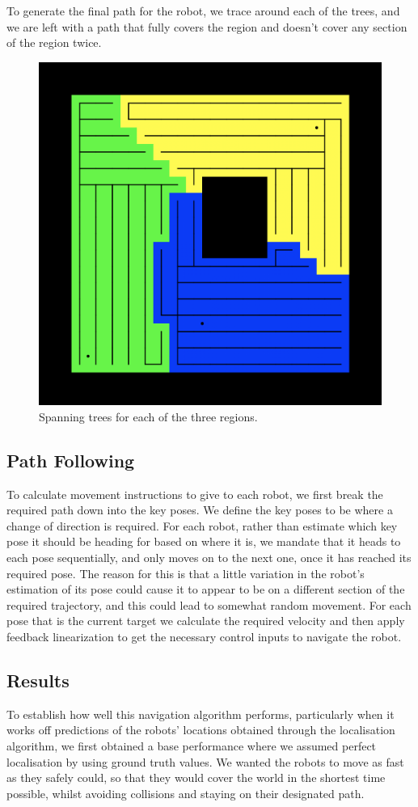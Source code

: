 \documentclass[a4paper, 10pt, conference]{ieeeconf}      %
\begin{document}
To generate the final path for the robot, we trace around each of the trees, and we are left with a path that fully covers the region and doesn't cover any section of the region twice.

\begin{figure}
	\centering
	\includegraphics[width=0.6\columnwidth]{figure_mst.png}
	\caption{Spanning trees for each of the three regions.}
	\label{fig:mst}
\end{figure}

\subsection{Path Following}
To calculate movement instructions to give to each robot, we first break the required path down into the key poses. We define the key poses to be where a change of direction is required. For each robot, rather than estimate which key pose it should be heading for based on where it is, we mandate that it heads to each pose sequentially, and only moves on to the next one, once it has reached its required pose. The reason for this is that a little variation in the robot's estimation of its pose could cause it to appear to be on a different section of the required trajectory, and this could lead to somewhat random movement. For each pose that is the current target we calculate the required velocity and then apply feedback linearization to get the necessary control inputs to navigate the robot.



\subsection{Results}
To establish how well this navigation algorithm performs, particularly when it works off predictions of the robots' locations obtained through the localisation algorithm, we first obtained a base performance where we assumed perfect localisation by using ground truth values. We wanted the robots to move as fast as they safely could, so that they would cover the world in the shortest time possible, whilst avoiding collisions and staying on their designated path.
\end{document}
